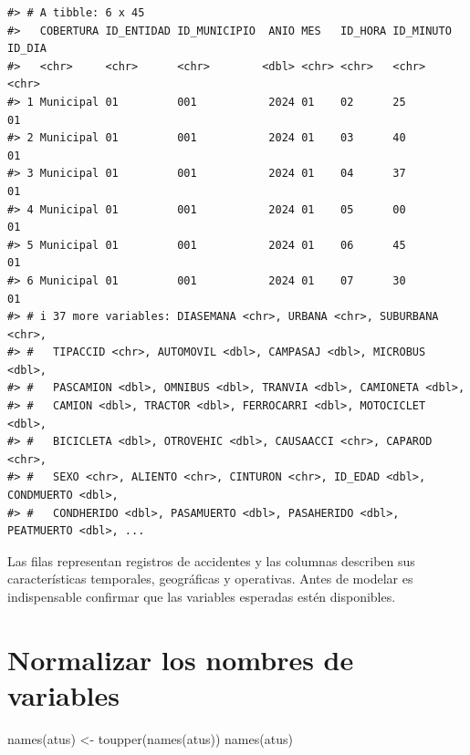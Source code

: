 \documentclass[
  spanish,
  10.5pt,
  letterpaper,
  openany,
  headings=big]{scrbook}
\newenvironment{Shaded}{}{}
\newcommand{\FunctionTok}[1]{\textcolor[rgb]{0.44,0.26,0.76}{#1}}
\newcommand{\NormalTok}[1]{\textcolor[rgb]{0.14,0.16,0.18}{#1}}
\newcommand{\OtherTok}[1]{\textcolor[rgb]{0.44,0.26,0.76}{#1}}
\begin{document}
\begin{verbatim}
#> # A tibble: 6 x 45
#>   COBERTURA ID_ENTIDAD ID_MUNICIPIO  ANIO MES   ID_HORA ID_MINUTO ID_DIA
#>   <chr>     <chr>      <chr>        <dbl> <chr> <chr>   <chr>     <chr> 
#> 1 Municipal 01         001           2024 01    02      25        01    
#> 2 Municipal 01         001           2024 01    03      40        01    
#> 3 Municipal 01         001           2024 01    04      37        01    
#> 4 Municipal 01         001           2024 01    05      00        01    
#> 5 Municipal 01         001           2024 01    06      45        01    
#> 6 Municipal 01         001           2024 01    07      30        01    
#> # i 37 more variables: DIASEMANA <chr>, URBANA <chr>, SUBURBANA <chr>,
#> #   TIPACCID <chr>, AUTOMOVIL <dbl>, CAMPASAJ <dbl>, MICROBUS <dbl>,
#> #   PASCAMION <dbl>, OMNIBUS <dbl>, TRANVIA <dbl>, CAMIONETA <dbl>,
#> #   CAMION <dbl>, TRACTOR <dbl>, FERROCARRI <dbl>, MOTOCICLET <dbl>,
#> #   BICICLETA <dbl>, OTROVEHIC <dbl>, CAUSAACCI <chr>, CAPAROD <chr>,
#> #   SEXO <chr>, ALIENTO <chr>, CINTURON <chr>, ID_EDAD <dbl>, CONDMUERTO <dbl>,
#> #   CONDHERIDO <dbl>, PASAMUERTO <dbl>, PASAHERIDO <dbl>, PEATMUERTO <dbl>, ...
\end{verbatim}

\begin{tcolorbox}[enhanced jigsaw, arc=.35mm, bottomrule=.15mm, bottomtitle=1mm, breakable, colback=white, colbacktitle=quarto-callout-tip-color!10!white, colframe=quarto-callout-tip-color-frame, coltitle=black, left=2mm, leftrule=.75mm, opacityback=0, opacitybacktitle=0.6, rightrule=.15mm, title=\textcolor{quarto-callout-tip-color}{\faLightbulb}\hspace{0.5em}{Interpretación}, titlerule=0mm, toprule=.15mm, toptitle=1mm]

Las filas representan registros de accidentes y las columnas describen
sus características temporales, geográficas y operativas. Antes de
modelar es indispensable confirmar que las variables esperadas estén
disponibles.

\end{tcolorbox}

\section{Normalizar los nombres de
variables}\label{normalizar-los-nombres-de-variables}

\begin{Shaded}
\begin{Highlighting}[]
\FunctionTok{names}\NormalTok{(atus) }\OtherTok{\textless{}{-}} \FunctionTok{toupper}\NormalTok{(}\FunctionTok{names}\NormalTok{(atus))}
\FunctionTok{names}\NormalTok{(atus)}
\end{Highlighting}
\end{Shaded}
\end{document}
